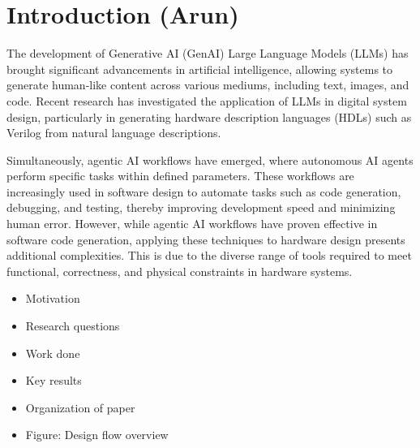 \section{Introduction (Arun)}
\label{sec:introduction}
The development of Generative AI (GenAI) Large Language Models (LLMs) has brought significant advancements in artificial intelligence, allowing systems to generate human-like content across various mediums, including text, images, and code. Recent research has investigated the application of LLMs in digital system design, particularly in generating hardware description languages (HDLs) such as Verilog from natural language descriptions. 

Simultaneously, agentic AI workflows have emerged, where autonomous AI agents perform specific tasks within defined parameters. These workflows are increasingly used in software design to automate tasks such as code generation, debugging, and testing, thereby improving development speed and minimizing human error. However, while agentic AI workflows have proven effective in software code generation, applying these techniques to hardware design presents additional complexities. This is due to the diverse range of tools required to meet functional, correctness, and physical constraints in hardware systems.



 \begin{itemize}
     \item Motivation
     \item Research questions
     \item Work done
     \item Key results
     \item Organization of paper
     \item Figure: Design flow overview
 \end{itemize}


